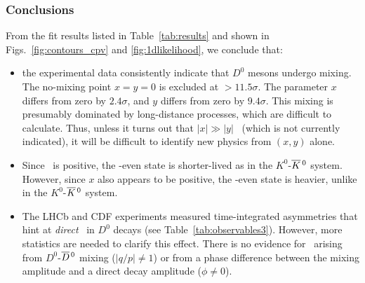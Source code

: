 
\subsubsection{Conclusions}

From the fit results listed in Table~\ref{tab:results}
and shown in Figs.~\ref{fig:contours_cpv} and \ref{fig:1dlikelihood},
we conclude that:
\begin{itemize}
\item the experimental data consistently indicate that 
$D^0$ mesons undergo mixing. The no-mixing point $x=y=0$
is excluded at $>11.5\sigma$. The parameter $x$ differs
from zero by $2.4\sigma$, and $y$ differs from zero by
$9.4\sigma$. This mixing is presumably dominated 
by long-distance processes, which are difficult to calculate.
Thus, unless it turns out that $|x|\gg |y|$~\cite{Bigi:2000wn}
(which is not currently indicated), it will be difficult to
identify new physics from $(x,y)$ alone.
\item Since \ycp\ is positive, the \cp-even state is shorter-lived
as in the $K^0$-$\overline{K}{}^{\,0}$ system. However, since $x$ also appears
to be positive, the \cp-even state is heavier, 
unlike in the $K^0$-$\overline{K}{}^{\,0}$ system.
\item The LHCb and CDF experiments measured time-integrated
asymmetries that hint at {\it direct\/} \cpv\ in $D^0$ decays
(see Table~\ref{tab:observables3}). However, more statistics 
are needed to clarify this effect.
There is no evidence for \cpv\ arising from $D^0$-$\overline{D}{}^{\,0}$
mixing ($|q/p|\neq 1$) or from a phase difference between
the mixing amplitude and a direct decay amplitude ($\phi\neq 0$). 
\end{itemize}

